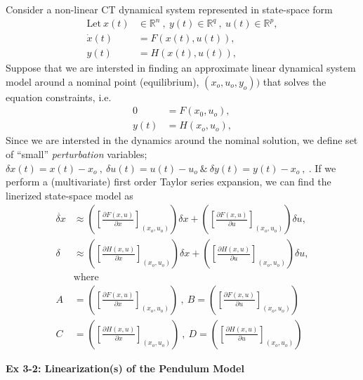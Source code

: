 \documentclass[twoside]{article}
\begin{document}
Consider a non-linear CT dynamical system represented in state-space form
%
\begin{align*}
  \mathrm{Let} \ x(t) &\in \mathbb{R}^n \ , \ y(t) \in \mathbb{R}^q \ ,\  u(t) \in
  \mathbb{R}^p , \\
  \dot{x}(t) &= F(x(t),u(t)) , \\
  y(t) &= H(x(t),u(t)) , 
\end{align*}
%
Suppose that we are intersted in finding an approximate linear
dynamical system model around a nominal point (equilibrium),
$(x_o,u_o,y_o))$ that solves the equation constraints, i.e.
%
\begin{align*}
  0 &= F(x_0,u_o) , \\
  y(t) &= H(x_o,u_o) , 
\end{align*}
%
Since we are intersted in the dynamics around the nominal solution, we
define set of ``small'' \textit{perturbation} variables; $\delta x(t)
= x(t) - x_o \ , \ \delta u(t) = u(t) - u_o \ \& \ \delta y(t) = y(t)
- x_o \ , \ $. If we perform a (multivariate) first order Taylor
series expansion, we can find the linerized state-space model as
%
\begin{align*}
  \dot{\delta x} &\approx \left( \left[ \frac{\partial F(x,u)}{\partial x}
                      \right]_{(x_o,u_o)} \right) \delta x + \left( \left[ \frac{\partial F(x,u)}{\partial u}
                      \right]_{(x_o,u_o)} \right) \delta u  , \\
  \delta  &\approx \left( \left[ \frac{\partial H(x,u)}{\partial x}
                      \right]_{(x_o,u_o)} \right) \delta x + \left( \left[ \frac{\partial H(x,u)}{\partial u}
                      \right]_{(x_o,u_o)} \right) \delta u , 
\\ 
&\mathrm{where}
\\
A &= \left( \left[ \frac{\partial F(x,u)}{\partial x}
                      \right]_{(x_o,u_o)} \right) \ , \ B = \left( \left[ \frac{\partial F(x,u)}{\partial u}
                      \right]_{(x_o,u_o)} \right)
\\
C &= \left( \left[ \frac{\partial H(x,u)}{\partial x}
                      \right]_{(x_o,u_o)} \right) \ , \ D = \left( \left[ \frac{\partial H(x,u)}{\partial u}
                      \right]_{(x_o,u_o)} \right)
\end{align*}
%

\textbf{Ex 3-2: Linearization(s) of the Pendulum Model}
\end{document}
